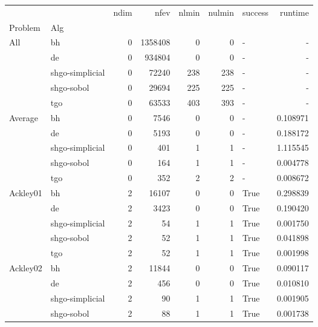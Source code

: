 \begin{longtable}{llrrrrlr}
\bottomrule
\endlastfoot
\toprule
         &    &  ndim &     nfev &  nlmin &  nulmin & success &     runtime \\
Problem & Alg &       &          &        &         &         &             \\
\midrule
All & bh &     0 &  1358408 &      0 &       0 &     - &         - \\
         & de &     0 &   934804 &      0 &       0 &     - &         - \\
         & shgo-simplicial &     0 &    72240 &    238 &     238 &     - &         - \\
         & shgo-sobol &     0 &    29694 &    225 &     225 &     - &         - \\
         & tgo &     0 &    63533 &    403 &     393 &     - &         - \\
\midrule
Average & bh &     0 &     7546 &      0 &       0 &     - &    0.108971 \\
         & de &     0 &     5193 &      0 &       0 &     - &    0.188172 \\
         & shgo-simplicial &     0 &      401 &      1 &       1 &     - &    1.115545 \\
         & shgo-sobol &     0 &      164 &      1 &       1 &     - &    0.004778 \\
         & tgo &     0 &      352 &      2 &       2 &     - &    0.008672 \\
         \midrule
Ackley01 & bh &     2 &    16107 &      0 &       0 &    True &    0.298839 \\
         & de &     2 &     3423 &      0 &       0 &    True &    0.190420 \\
         & shgo-simplicial &     2 &       54 &      1 &       1 &    True &    0.001750 \\
         & shgo-sobol &     2 &       52 &      1 &       1 &    True &    0.041898 \\
         & tgo &     2 &       52 &      1 &       1 &    True &    0.001998 \\
Ackley02 & bh &     2 &    11844 &      0 &       0 &    True &    0.090117 \\
         & de &     2 &      456 &      0 &       0 &    True &    0.010810 \\
         & shgo-simplicial &     2 &       90 &      1 &       1 &    True &    0.001905 \\
         & shgo-sobol &     2 &       88 &      1 &       1 &    True &    0.001738 \\

\end{longtable}
